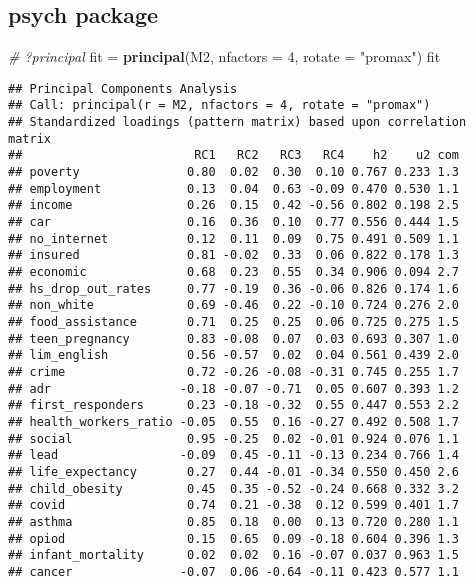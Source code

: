\documentclass[
]{article}
\newenvironment{Shaded}{\begin{snugshade}}{\end{snugshade}}
\newcommand{\CommentTok}[1]{\textcolor[rgb]{0.56,0.35,0.01}{\textit{#1}}}
\newcommand{\DataTypeTok}[1]{\textcolor[rgb]{0.13,0.29,0.53}{#1}}
\newcommand{\DecValTok}[1]{\textcolor[rgb]{0.00,0.00,0.81}{#1}}
\newcommand{\KeywordTok}[1]{\textcolor[rgb]{0.13,0.29,0.53}{\textbf{#1}}}
\newcommand{\NormalTok}[1]{#1}
\newcommand{\StringTok}[1]{\textcolor[rgb]{0.31,0.60,0.02}{#1}}
\begin{document}
\hypertarget{psych-package}{%
\subsection{psych package}\label{psych-package}}

\begin{Shaded}
\begin{Highlighting}[]
\CommentTok{# ?principal}
\NormalTok{fit =}\StringTok{ }\KeywordTok{principal}\NormalTok{(M2, }\DataTypeTok{nfactors =} \DecValTok{4}\NormalTok{, }\DataTypeTok{rotate =} \StringTok{"promax"}\NormalTok{)}
\NormalTok{fit}
\end{Highlighting}
\end{Shaded}

\begin{verbatim}
## Principal Components Analysis
## Call: principal(r = M2, nfactors = 4, rotate = "promax")
## Standardized loadings (pattern matrix) based upon correlation matrix
##                        RC1   RC2   RC3   RC4    h2    u2 com
## poverty               0.80  0.02  0.30  0.10 0.767 0.233 1.3
## employment            0.13  0.04  0.63 -0.09 0.470 0.530 1.1
## income                0.26  0.15  0.42 -0.56 0.802 0.198 2.5
## car                   0.16  0.36  0.10  0.77 0.556 0.444 1.5
## no_internet           0.12  0.11  0.09  0.75 0.491 0.509 1.1
## insured               0.81 -0.02  0.33  0.06 0.822 0.178 1.3
## economic              0.68  0.23  0.55  0.34 0.906 0.094 2.7
## hs_drop_out_rates     0.77 -0.19  0.36 -0.06 0.826 0.174 1.6
## non_white             0.69 -0.46  0.22 -0.10 0.724 0.276 2.0
## food_assistance       0.71  0.25  0.25  0.06 0.725 0.275 1.5
## teen_pregnancy        0.83 -0.08  0.07  0.03 0.693 0.307 1.0
## lim_english           0.56 -0.57  0.02  0.04 0.561 0.439 2.0
## crime                 0.72 -0.26 -0.08 -0.31 0.745 0.255 1.7
## adr                  -0.18 -0.07 -0.71  0.05 0.607 0.393 1.2
## first_responders      0.23 -0.18 -0.32  0.55 0.447 0.553 2.2
## health_workers_ratio -0.05  0.55  0.16 -0.27 0.492 0.508 1.7
## social                0.95 -0.25  0.02 -0.01 0.924 0.076 1.1
## lead                 -0.09  0.45 -0.11 -0.13 0.234 0.766 1.4
## life_expectancy       0.27  0.44 -0.01 -0.34 0.550 0.450 2.6
## child_obesity         0.45  0.35 -0.52 -0.24 0.668 0.332 3.2
## covid                 0.74  0.21 -0.38  0.12 0.599 0.401 1.7
## asthma                0.85  0.18  0.00  0.13 0.720 0.280 1.1
## opiod                 0.15  0.65  0.09 -0.18 0.604 0.396 1.3
## infant_mortality      0.02  0.02  0.16 -0.07 0.037 0.963 1.5
## cancer               -0.07  0.06 -0.64 -0.11 0.423 0.577 1.1

\end{verbatim}
\end{document}
